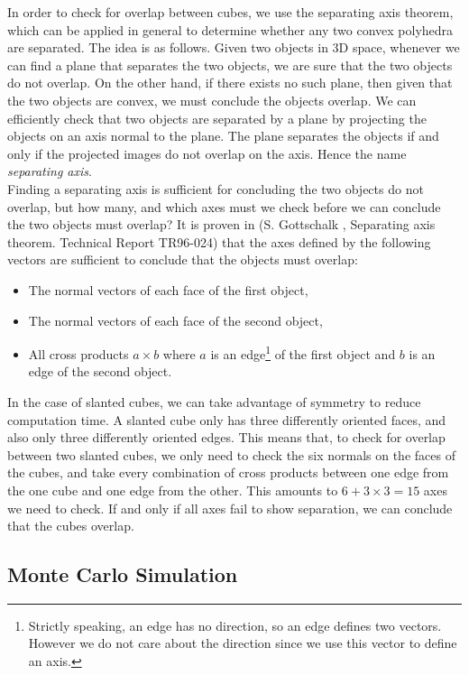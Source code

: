 \documentclass[thesis]{subfiles}
\begin{document}
In order to check for overlap between cubes, we use the separating axis theorem, which can be applied in general to determine whether any two convex polyhedra are separated. The idea is as follows. Given two objects in 3D space, whenever we can find a plane that separates the two objects, we are sure that the two objects do not overlap. On the other hand, if there exists no such plane, then given that the two objects are convex, we must conclude the objects overlap. We can efficiently check that two objects are separated by a plane by projecting the objects on an axis normal to the plane. The plane separates the objects if and only if the projected images do not overlap on the axis. Hence the name \emph{separating axis}. \\

Finding a separating axis is sufficient for concluding the two objects do not overlap, but how many, and which axes must we check before we can conclude the two objects must overlap? It is proven in  (S. Gottschalk , Separating axis theorem. Technical Report TR96-024) that the axes defined by the following vectors are sufficient to conclude that the objects must overlap:
\begin{itemize}
	\item The normal vectors of each face of the first object,
	\item The normal vectors of each face of the second object,
	\item All cross products $a \times b$ where $a$ is an edge\footnote{Strictly speaking, an edge has no direction, so an edge defines two vectors. However we do not care about the direction since we use this vector to define an axis.} of the first object and $b$ is an edge of the second object.
\end{itemize}

In the case of slanted cubes, we can take advantage of symmetry to reduce computation time. A slanted cube only has three differently oriented faces, and also only three differently oriented edges. This means that, to check for overlap between two slanted cubes, we only need to check the six normals on the faces of the cubes, and take every combination of cross products between one edge from the one cube and one edge from the other. This amounts to $6 + 3 \times 3 = 15$ axes we need to check. If and only if all axes fail to show separation, we can conclude that the cubes overlap.

\subsection{Monte Carlo Simulation}\label{subsec:MCsim}
\end{document}
